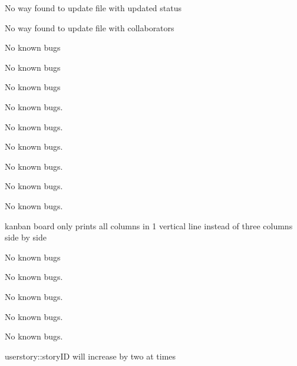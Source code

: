 
\begin{DoxyRefList}
\item[File \mbox{\hyperlink{_backlog_8cpp}{Backlog.cpp}} ]\label{bug__bug000001}%
%
No way found to update file with updated status 



No way found to update file with collaborators  
\item[File \mbox{\hyperlink{_backlog_8h}{Backlog.h}} ]\label{bug__bug000002}%
%
No known bugs  
\item[File \mbox{\hyperlink{_board_8cpp}{Board.cpp}} ]\label{bug__bug000003}%
%
No known bugs  
\item[File \mbox{\hyperlink{_board_8h}{Board.h}} ]\label{bug__bug000004}%
%
No known bugs  
\item[File \mbox{\hyperlink{_collaborator_8cpp}{Collaborator.cpp}} ]\label{bug__bug000005}%
%
No known bugs.  
\item[File \mbox{\hyperlink{_collaborator_8h}{Collaborator.h}} ]\label{bug__bug000006}%
%
No known bugs.  
\item[File \mbox{\hyperlink{_developer_8cpp}{Developer.cpp}} ]\label{bug__bug000007}%
%
No known bugs.  
\item[File \mbox{\hyperlink{_developer_8h}{Developer.h}} ]\label{bug__bug000008}%
%
No known bugs.  
\item[File \mbox{\hyperlink{_iteration_8cpp}{Iteration.cpp}} ]\label{bug__bug000009}%
%
No known bugs.  
\item[File \mbox{\hyperlink{_iteration_8h}{Iteration.h}} ]\label{bug__bug000010}%
%
No known bugs.  
\item[File \mbox{\hyperlink{_kanban_board_8cpp}{Kanban\+Board.cpp}} ]\label{bug__bug000011}%
%
kanban board only prints all columns in 1 vertical line instead of three columns side by side  
\item[File \mbox{\hyperlink{_kanban_board_8h}{Kanban\+Board.h}} ]\label{bug__bug000012}%
%
No known bugs  
\item[File \mbox{\hyperlink{_release_8cpp}{Release.cpp}} ]\label{bug__bug000013}%
%
No known bugs.  
\item[File \mbox{\hyperlink{_release_8h}{Release.h}} ]\label{bug__bug000014}%
%
No known bugs.  
\item[File \mbox{\hyperlink{_scrum_master_8cpp}{Scrum\+Master.cpp}} ]\label{bug__bug000015}%
%
No known bugs.  
\item[File \mbox{\hyperlink{_scrum_master_8h}{Scrum\+Master.h}} ]\label{bug__bug000016}%
%
No known bugs.  
\item[File \mbox{\hyperlink{_source_8cpp}{Source.cpp}} ]\label{bug__bug000017}%
%
userstory\+::story\+ID will increase by two at times 




\end{DoxyRefList}
